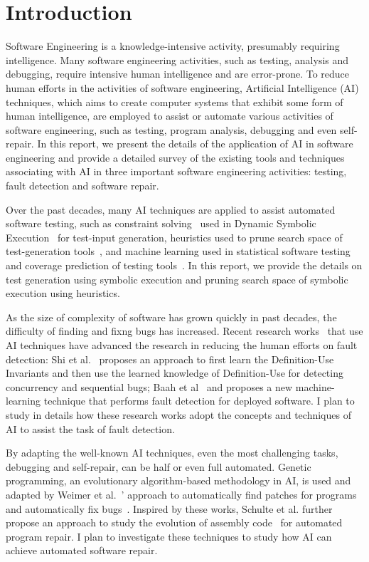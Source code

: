 \section{Introduction} 
Software Engineering is a knowledge-intensive activity, presumably requiring intelligence. Many software engineering activities, such as testing, analysis and debugging, require intensive human intelligence and are error-prone. To reduce human efforts in the activities of software engineering, Artificial Intelligence (AI) techniques, which aims to create computer systems that exhibit some form of human intelligence, are employed to assist or automate various activities of software engineering, such as testing, program analysis, debugging and even self-repair. In this report, we present the details of the application of AI in software engineering and provide a detailed survey of the existing tools and techniques associating with AI in three important software engineering activities: testing,
fault detection and software repair.

Over the past decades, many AI techniques are applied to assist automated software testing, such as constraint solving~\cite{constraintsolving} used in Dynamic Symbolic Execution~\cite{symbolic, dart, cute} for test-input generation, heuristics used to prune search space of test-generation tools~\cite{prune,fitness}, and machine learning used in statistical software testing~\cite{mlinstatistics} and coverage prediction of testing tools~\cite{predictCoverage}. In this report, we provide the details on test generation using symbolic execution and pruning search space of symbolic execution using heuristics.

As the size of complexity of software has grown quickly in past decades, the difficulty of finding and fixng bugs has increased. Recent research works~\cite{wrongDefinition,online} that use AI techniques have advanced the research in reducing the human efforts on fault detection: Shi et al.~\cite{wrongDefinition} proposes an approach to first learn the Definition-Use Invariants and then use the learned knowledge of Definition-Use for detecting concurrency and sequential bugs; Baah et al~\cite{online} and proposes a new machine-learning technique that performs fault detection for deployed software. I plan to study in details how these research works adopt the concepts and techniques of AI to assist the task of fault detection.

By adapting the well-known AI techniques, even the most challenging tasks, debugging and self-repair, can be half or even full automated. Genetic programming, an evolutionary algorithm-based methodology in AI, is used and adapted by Weimer et al.~\cite{geneticPatch}' approach to automatically find patches for programs and automatically fix bugs~\cite{repair}. Inspired by these works, Schulte et al. further propose an approach to study the evolution of assembly code~\cite{evolutionaryComputation} for automated program repair. I plan to investigate these techniques to study how AI can achieve automated software repair.



